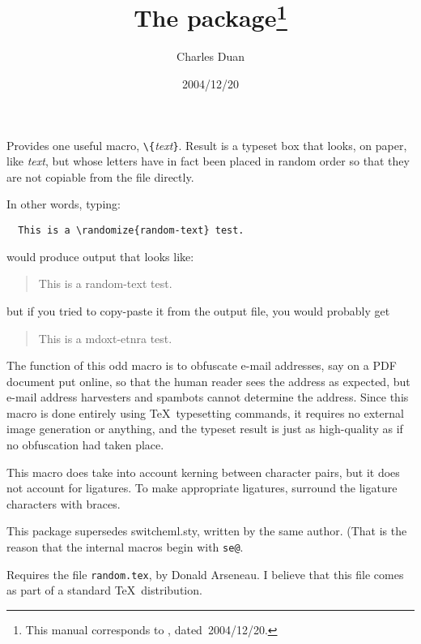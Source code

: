 \documentclass[pagesize=auto, parskip=half]{scrartcl}
\title{The \pkg{randtext} package\thanks{This manual corresponds to \pkg{randtext.sty}, dated~2004/12/20.}}
\author{Charles Duan}
\date{2004/12/20}
\makeatletter
\newcommand*{\pkg}[1]{\textsf{#1}}
\newcommand*{\cs}[1]{\texttt{\textbackslash#1}}
\newcommand*{\cmd}[1]{\cs{\expandafter\@gobble\string#1}}
\newcommand*{\meta}[1]{\textlangle\textsl{#1}\textrangle}
\newcommand*{\marg}[1]{\texttt{\{}\meta{#1}\texttt{\}}}
\makeatother
\begin{document}
\maketitle

\noindent
Provides one useful macro, \cmd{\randomize}\marg{text}. Result is a typeset box that
looks, on paper, like \meta{text}, but whose letters have in fact been placed in
random order so that they are not copiable from the file directly.

In other words, typing:
%
\begin{verbatim}
  This is a \randomize{random-text} test.
\end{verbatim}
%
would produce output that looks like:
%
\begin{quote}
  This is a random-text test.
\end{quote}
%
but if you tried to copy-paste it from the output file, you would probably get
%
\begin{quote}
  This is a mdoxt-etnra test.
\end{quote}
%
The function of this odd macro is to obfuscate e-mail addresses, say on a PDF
document put online, so that the human reader sees the address as expected,
but e-mail address harvesters and spambots cannot determine the address. Since
this macro is done entirely using \TeX\ typesetting commands, it requires no
external image generation or anything, and the typeset result is just as
high-quality as if no obfuscation had taken place.

This macro does take into account kerning between character pairs, but it does
not account for ligatures. To make appropriate ligatures, surround the
ligature characters with braces.

This package supersedes \pkg{switcheml.sty}, written by the same author. (That is
the reason that the internal macros begin with \verb+se@+.

Requires the file \texttt{random.tex}, by Donald Arseneau. I believe that this file
comes as part of a standard \TeX\ distribution.
\end{document}
